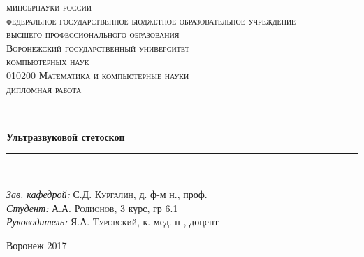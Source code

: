 \begin{titlepage}

\newcommand{\HRule}{\rule{\linewidth}{0.5mm}} %

\center %
 
\textsc {
\footnotesize{
минобрнауки россии\\
федеральное государственное бюджетное образовательное учреждение\\
высшего профессионального образования}\\
\large{Воронежский государственный университет}
}\\[1.0cm] %


\textsc{ компьютерных наук}\\ %
\textsc{\footnotesize010200 Математика и компьютерные науки}\\[1.0cm] 
\textsc{\Large дипломная работа}\\[0.5cm] %



\HRule \\[0.4cm]
{ \huge \bfseries Ультразвуковой стетоскоп}\\[0.4cm] %
\HRule \\[1.5cm]
 


\begin{flushleft} \large
\emph{Зав. кафедрой:} С.Д. \textsc{Кургалин}, д. ф-м н., проф.\\
\emph{Студент:} А.А. \textsc{Родионов}, 3 курс, гр 6.1 \\ %
\emph{Руководитель:} Я.А. \textsc{Туровский}, к. мед. н , доцент %
\end{flushleft}



\vfill %
\begin{center}
Воронеж 2017
\end{center}
\end{titlepage}

